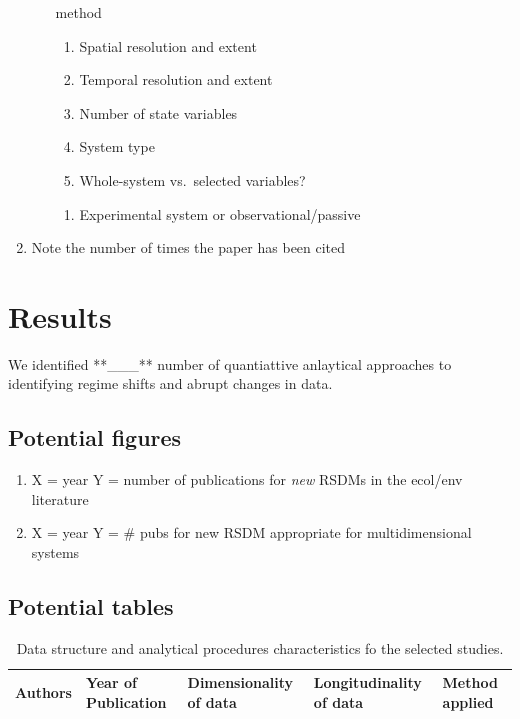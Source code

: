\documentclass[12pt,twoside]{reedthesis}
\providecommand{\tightlist}{%
  \setlength{\itemsep}{0pt}\setlength{\parskip}{0pt}}
\def\labelenumi{\arabic{enumi}.}
\def\labelenumi{\arabic{enumi}.}
\begin{document}
\begin{enumerate}
\begin{enumerate}
    method
    \begin{enumerate}
    \def\labelenumiii{\alph{enumiii}.}
    \tightlist
    \item
      Spatial resolution and extent
    \item
      Temporal resolution and extent
    \item
      Number of state variables
    \item
      System type
    \item
      Whole-system vs.~selected variables?
    \end{enumerate}
    \begin{enumerate}
    \def\labelenumiii{\roman{enumiii}.}
    \setcounter{enumiii}{1}
    \tightlist
    \item
      Experimental system or observational/passive
    \end{enumerate}
  \end{enumerate}
\item
  Note the number of times the paper has been cited
\end{enumerate}
\section{Results}\label{results}

We identified **\_\_\_** number of quantiattive anlaytical approaches to
identifying regime shifts and abrupt changes in data.

\subsection{Potential figures}\label{potential-figures}
\begin{enumerate}
\def\labelenumi{\arabic{enumi}.}
\tightlist
\item
  X = year Y = number of publications for \emph{new} RSDMs in the
  ecol/env literature
\item
  X = year Y = \# pubs for new RSDM appropriate for multidimensional
  systems
\end{enumerate}
\subsection{Potential tables}\label{potential-tables}
\begin{longtable}[t]{lllll}
\caption{\label{tab:characteristicsResults}Data structure and analytical procedures characteristics fo the selected studies.}\\
\toprule
Authors & Year of Publication & Dimensionality of data & Longitudinality of data & Method applied\\
\bottomrule
\end{longtable}
\end{document}
